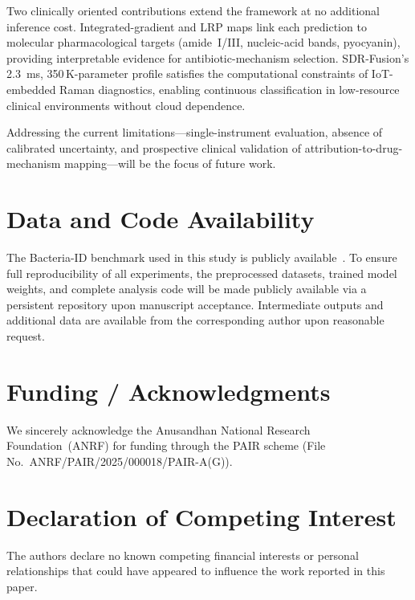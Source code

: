 \documentclass[preprint,12pt]{elsarticle}
\begin{document}
Two clinically oriented contributions extend the framework at no
additional inference cost. Integrated-gradient and LRP maps link each
prediction to molecular pharmacological targets (amide~I/III,
nucleic-acid bands, pyocyanin), providing interpretable evidence for
antibiotic-mechanism selection. SDR-Fusion's 2.3~ms, 350\,K-parameter
profile satisfies the computational constraints of IoT-embedded Raman
diagnostics, enabling continuous classification in low-resource
clinical environments without cloud dependence.

Addressing the current limitations---single-instrument evaluation,
absence of calibrated uncertainty, and prospective clinical validation
of attribution-to-drug-mechanism mapping---will be the focus of future
work.

\section*{Data and Code Availability}

The Bacteria-ID benchmark used in this study is publicly
available~\cite{ho2019rapid}. To ensure full reproducibility of all
experiments, the preprocessed datasets, trained model weights, and
complete analysis code will be made publicly available via a persistent
repository upon manuscript acceptance. Intermediate outputs and
additional data are available from the corresponding author upon
reasonable request.

\section*{Funding / Acknowledgments}

We sincerely acknowledge the Anusandhan National Research
Foundation~(ANRF) for funding through the PAIR scheme (File
No.\ ANRF/PAIR/2025/000018/PAIR-A(G)).

\section*{Declaration of Competing Interest}

The authors declare no known competing financial interests or personal
relationships that could have appeared to influence the work reported
in this paper.
\end{document}
